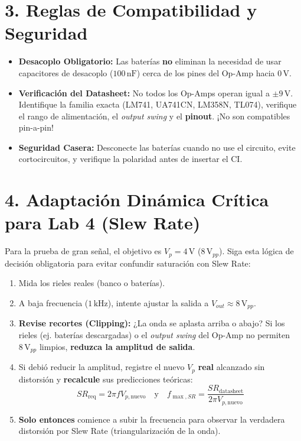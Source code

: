 \documentclass[11pt, a4paper]{article}
\begin{document}
\section*{3. Reglas de Compatibilidad y Seguridad}
\begin{itemize}
    \item \textbf{Desacoplo Obligatorio:} Las baterías \textbf{no} eliminan la necesidad de usar capacitores de desacoplo ($100\,\text{nF}$) cerca de los pines del Op-Amp hacia $0\,\text{V}$.
    \item \textbf{Verificación del Datasheet:} No todos los Op-Amps operan igual a $\pm9\,\text{V}$. Identifique la familia exacta (LM741, UA741CN, LM358N, TL074), verifique el rango de alimentación, el \textit{output swing} y el \textbf{pinout}. ¡No son compatibles pin-a-pin!
    \item \textbf{Seguridad Casera:} Desconecte las baterías cuando no use el circuito, evite cortocircuitos, y verifique la polaridad antes de insertar el CI.
\end{itemize}

\section*{4. Adaptación Dinámica Crítica para Lab 4 (Slew Rate)}
Para la prueba de gran señal, el objetivo es $V_p = 4\,\text{V}$ ($8\,\text{V}_{pp}$). Siga esta lógica de decisión obligatoria para evitar confundir saturación con Slew Rate:
\begin{enumerate}
    \setlength{\itemsep}{0pt}
    \item Mida los rieles reales (banco o baterías).
    \item A baja frecuencia ($1\,\text{kHz}$), intente ajustar la salida a $V_{out} \approx 8\,\text{V}_{pp}$.
    \item \textbf{Revise recortes (Clipping):} ¿La onda se aplasta arriba o abajo? Si los rieles (ej. baterías descargadas) o el \textit{output swing} del Op-Amp no permiten $8\,\text{V}_{pp}$ limpios, \textbf{reduzca la amplitud de salida}.
    \item Si debió reducir la amplitud, registre el nuevo $V_p$ \textbf{real} alcanzado sin distorsión y \textbf{recalcule} sus predicciones teóricas:
    \begin{equation*}
        SR_{\mathrm{req}} = 2\pi f V_{p,\mathrm{nuevo}} \quad \text{y} \quad f_{\max,SR} = \frac{SR_{\mathrm{datasheet}}}{2\pi V_{p,\mathrm{nuevo}}} \text{}
    \end{equation*}
    \item \textbf{Solo entonces} comience a subir la frecuencia para observar la verdadera distorsión por Slew Rate (triangularización de la onda).
\end{enumerate}
\end{document}
